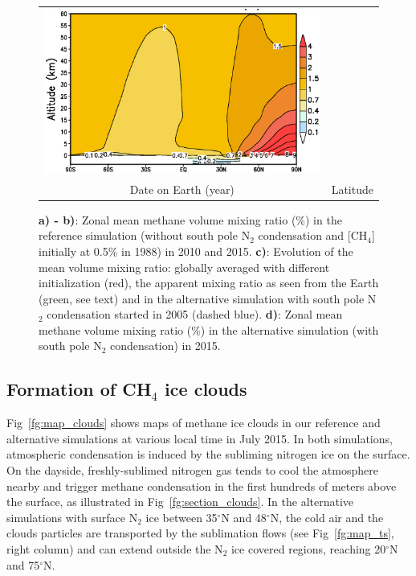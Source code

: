 \begin{figure}
\begin{center}
\begin{tabular}[h]{cc}
   \includegraphics[height=5.cm,angle=-0,clip]{figures/section_ch4_pole_2015.eps} \\
\hspace{-1.cm}
 Date on Earth (year) & Latitude \\
\end{tabular}
    \caption{
\label{fg:ch4}
{\bf a) - b)}: Zonal mean methane volume mixing ratio (\%) in the reference simulation 
(without south pole N$_2$ condensation and [CH$_4$] initially at 0.5\% in 1988) 
in 2010 and 2015. 
{\bf c)}: Evolution of the mean volume mixing ratio: 
globally averaged with different initialization (red), the apparent mixing ratio
 as seen from the Earth (green, see text) 
and in the alternative simulation with south pole N$_2$ condensation started in 2005 (dashed blue).
{\bf d)}: Zonal mean methane volume mixing ratio (\%) in the alternative simulation
(with south pole N$_2$ condensation) in 2015. 
}
  \end{center}
\end{figure}


\subsection{Formation of CH$_4$ ice clouds}
\label{sc:ch4_clouds}

Fig~\ref{fg:map_clouds} shows  maps of methane ice clouds in our
reference and alternative simulations at various local time in July 2015.
In both simulations, atmospheric condensation
is induced by the subliming nitrogen ice on the surface. On the dayside, freshly-sublimed
nitrogen gas tends to cool the atmosphere nearby and trigger methane condensation in the
first hundreds of meters above the surface, as
illustrated in Fig~\ref{fg:section_clouds}. In the alternative simulations 
with surface N$_2$ ice between 35$^\circ$N and 48$^\circ$N,
the cold air and the clouds particles are transported by the sublimation flows (see
Fig~\ref{fg:map_ts}, right column) and can extend outside the N$_2$ ice covered
regions, reaching 20$^\circ$N and 75$^\circ$N.  



